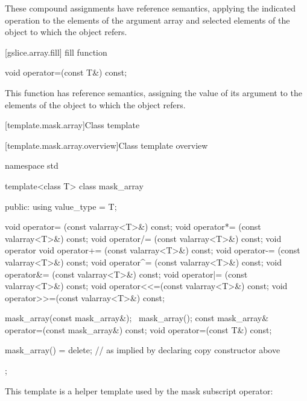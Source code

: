 \begin{itemdescr}
\pnum
These compound assignments have reference semantics, applying the
indicated operation to the elements of the argument array and selected
elements of the
object to which the
object refers.
\end{itemdescr}

[gslice.array.fill]{ fill function}

%
\begin{itemdecl}
void operator=(const T&) const;
\end{itemdecl}

\begin{itemdescr}
\pnum
This function has reference semantics, assigning the value of its argument
to the elements of the
object to which the
object refers.
\end{itemdescr}

[template.mask.array]{Class template }

[template.mask.array.overview]{Class template  overview}

%
%
\begin{codeblock}
namespace std {
  template<class T> class mask_array {
  public:
    using value_type = T;

    void operator=  (const valarray<T>&) const;
    void operator*= (const valarray<T>&) const;
    void operator/= (const valarray<T>&) const;
    void operator%
    void operator+= (const valarray<T>&) const;
    void operator-= (const valarray<T>&) const;
    void operator^= (const valarray<T>&) const;
    void operator&= (const valarray<T>&) const;
    void operator|= (const valarray<T>&) const;
    void operator<<=(const valarray<T>&) const;
    void operator>>=(const valarray<T>&) const;

    mask_array(const mask_array&);
    ~mask_array();
    const mask_array& operator=(const mask_array&) const;
    void operator=(const T&) const;

    mask_array() = delete;        // as implied by declaring copy constructor above
  };
}
\end{codeblock}

\pnum
This template is a helper template used by the mask subscript operator:

